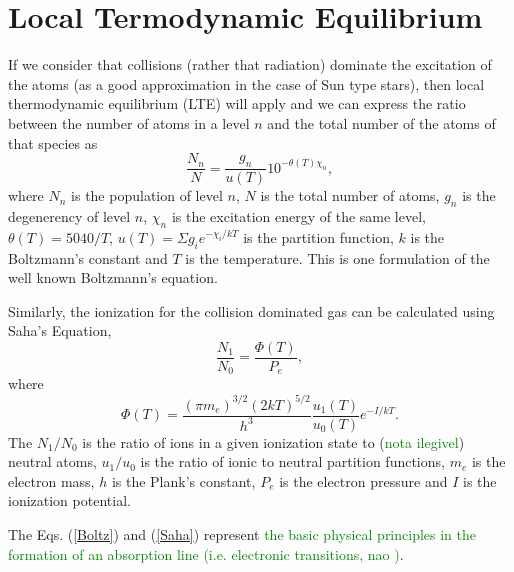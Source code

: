 \documentclass[dvips,12pt,a4paper]{report}
\begin{document}
{\section {Local Termodynamic Equilibrium}
\label{LTE}
If we consider that collisions (rather that radiation) dominate the excitation of the atoms (as a good approximation in the case of Sun type stars), then local thermodynamic equilibrium (LTE) will apply and we can express the ratio between the number of atoms in a level $n$ and the total number of the atoms of that species as
\begin{equation}
\label{Boltz}
 \frac{N_n}{N}=\frac{g_n}{u(T)}10^{-\theta(T)\chi_n},
\end{equation}
where $N_n$ is the population of level $n$, $N$ is the total number of atoms, $g_n$ is the degenerency of level $n$, $\chi_n$ is the excitation energy of the same level, $\theta(T)=5040/T$, $u(T)=\Sigma g_ie^{-\chi_i/kT}$ is the partition function, $k$ is the Boltzmann's constant and $T$ is the temperature. This is one formulation of the well known Boltzmann's equation. %

Similarly, the ionization for the collision dominated gas can be calculated using Saha's Equation,
\begin{equation}
\label{Saha}
\frac{N_1}{N_0}=\frac{\Phi(T)}{P_e},
\end{equation}
where 
\begin {equation}
\Phi(T)=\frac{(\pi m_e)^{3/2}(2kT)^{5/2}}{h^3}\frac{u_1(T)}{u_0(T)}e^{-I/kT}.
\end {equation}
The $N_1/N_0$ is the ratio of ions in a given ionization state  to (\textcolor{green}{nota ilegivel}) neutral atoms, $u_1/u_0$ is the ratio of ionic to neutral partition functions, $m_e$ is the electron mass, $h$ is the Plank's constant, $P_e$ is the electron pressure and $I$ is the ionization potential.

The Eqs. (\ref{Boltz}) and (\ref{Saha}) represent \textcolor{green}{the basic physical principles in the formation of an absorption line (i.e. electronic transitions, nao )}. %




}
\end{document}
